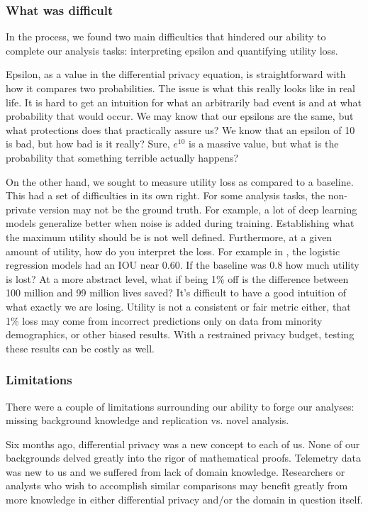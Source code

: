 \documentclass[12pt,letterpaper]{article}
\begin{document}
\subsubsection{What was difficult}
In the process, we found two main difficulties that hindered our ability to complete our analysis tasks: interpreting epsilon and quantifying utility loss.

Epsilon, as a value in the differential privacy equation, is straightforward with how it compares two probabilities. The issue is what this really looks like in real life. It is hard to get an intuition for what an arbitrarily bad event is and at what probability that would occur. We may know that our epsilons are the same, but what protections does that practically assure us? We know that an epsilon of 10 is bad, but how bad is it really? Sure, $e^{10}$ is a massive value, but what is the probability that something terrible actually happens?

On the other hand, we sought to measure utility loss as compared to a baseline. This had a set of difficulties in its own right. For some analysis tasks, the non-private version may not be the ground truth. For example, a lot of deep learning models generalize better when noise is added during training. Establishing what the maximum utility should be is not well defined. Furthermore, at a given amount of utility, how do you interpret the loss. For example in \cite{qtr1proj}, the logistic regression models had an IOU near 0.60. If the baseline was 0.8 how much utility is lost? At a more abstract level, what if being 1\% off is the difference between 100 million and 99 million lives saved? It's difficult to have a good intuition of what exactly we are losing. Utility is not a consistent or fair metric either, that 1\% loss may come from incorrect predictions only on data from minority demographics, or other biased results. With a restrained privacy budget, testing these results can be costly as well.

\subsubsection{Limitations}
There were a couple of limitations surrounding our ability to forge our analyses: missing background knowledge and replication vs. novel analysis.

Six months ago, differential privacy was a new concept to each of us. None of our backgrounds delved greatly into the rigor of mathematical proofs. Telemetry data was new to us and we suffered from lack of domain knowledge. Researchers or analysts who wish to accomplish similar comparisons may benefit greatly from more knowledge in either differential privacy and/or the domain in question itself. 
\end{document}
